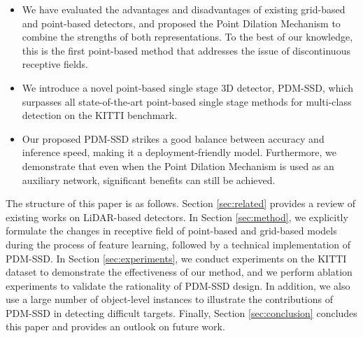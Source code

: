 \begin{itemize}
	\item {We have evaluated the advantages and disadvantages of existing grid-based and point-based detectors, and proposed the Point Dilation Mechanism to combine the strengths of both representations. To the best of our knowledge, this is the first point-based method that addresses the issue of discontinuous receptive fields.}
	\item {We introduce a novel point-based single stage 3D detector, PDM-SSD, which surpasses all state-of-the-art point-based single stage methods for multi-class detection on the KITTI benchmark.}
	\item {Our proposed PDM-SSD strikes a good balance between accuracy and inference speed, making it a deployment-friendly model. Furthermore, we demonstrate that even when the Point Dilation Mechanism is used as an auxiliary network, significant benefits can still be achieved.}
\end{itemize}

The structure of this paper is as follows. Section \ref{sec:related} provides a review of existing works on LiDAR-based detectors. In Section \ref{sec:method}, we explicitly formulate the changes in receptive field of point-based and grid-based models during the process of feature learning, followed by a technical implementation of PDM-SSD. In Section \ref{sec:experiments}, we conduct experiments on the KITTI dataset to demonstrate the effectiveness of our method, and we perform ablation experiments to validate the rationality of PDM-SSD design. In addition, we also use a large number of object-level instances to illustrate the contributions of PDM-SSD in detecting difficult targets. Finally, Section \ref{sec:conclusion} concludes this paper and provides an outlook on future work.
